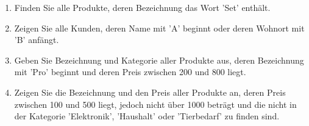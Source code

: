 \documentclass[11pt, a4paper, oneside]{article}
\begin{document}
	\begin{enumerate}[label=\alph*)]
		\item Finden Sie alle Produkte, deren Bezeichnung das Wort 'Set' enthält.
		
		\lines[2cm]
		\item Zeigen Sie alle Kunden, deren Name mit 'A' beginnt oder deren Wohnort mit 'B' anfängt.
		
		\lines[2cm]
		\item Geben Sie Bezeichnung und Kategorie aller Produkte aus, deren Bezeichnung mit 'Pro' beginnt und deren Preis zwischen 200 und 800 liegt.
		
		\lines[2cm]
		\item Zeigen Sie die Bezeichnung und den Preis aller Produkte an, deren Preis zwischen 100 und 500 liegt, jedoch nicht über 1000 beträgt und die nicht in der Kategorie 'Elektronik', 'Haushalt' oder 'Tierbedarf' zu finden sind.
		
		\lines[2cm]
	\end{enumerate}
\end{document}
